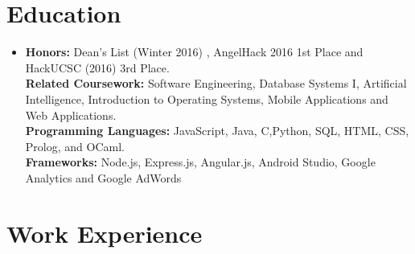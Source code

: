 \documentclass[11pt,a4paper,sans]{moderncv}        %
\begin{document}
\makecvtitle
\section{Education}

\vspace{0pt}

\begin{itemize}

\item{}
\vspace{1pt}
 \textbf{Honors:} Dean's List (Winter 2016) , AngelHack 2016 1st Place and HackUCSC (2016) 3rd Place.
 \\ \textbf{Related Coursework:} Software Engineering, Database Systems I, Artificial Intelligence, Introduction to Operating Systems, Mobile Applications and Web Applications.
 \\ \textbf{Programming Languages:} JavaScript, Java, C,Python, SQL, HTML, CSS, Prolog, and OCaml.
 \\ \textbf{Frameworks:} Node.js, Express.js, Angular.js, Android Studio, Google Analytics and Google AdWords

\end{itemize}
\section{Work Experience}

\vspace{1pt}
\end{document}
